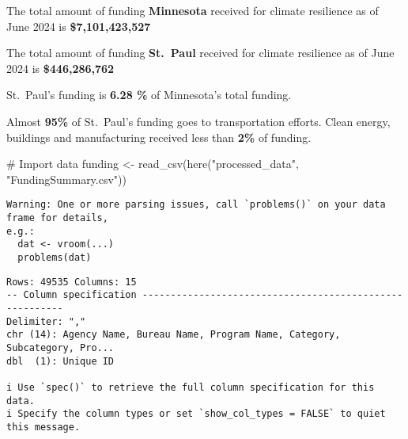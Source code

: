\documentclass[
  letterpaper,
  DIV=11,
  numbers=noendperiod]{scrartcl}
\newenvironment{Shaded}{\begin{snugshade}}{\end{snugshade}}
\newcommand{\CommentTok}[1]{\textcolor[rgb]{0.37,0.37,0.37}{#1}}
\newcommand{\FunctionTok}[1]{\textcolor[rgb]{0.28,0.35,0.67}{#1}}
\newcommand{\NormalTok}[1]{\textcolor[rgb]{0.00,0.23,0.31}{#1}}
\newcommand{\OtherTok}[1]{\textcolor[rgb]{0.00,0.23,0.31}{#1}}
\newcommand{\StringTok}[1]{\textcolor[rgb]{0.13,0.47,0.30}{#1}}
\begin{document}
\begin{tcolorbox}[enhanced jigsaw, rightrule=.15mm, bottomtitle=1mm, arc=.35mm, toptitle=1mm, leftrule=.75mm, toprule=.15mm, titlerule=0mm, title=\textcolor{quarto-callout-note-color}{\faInfo}\hspace{0.5em}{RQ 1: How much climate resilience funding has St.~Paul received?}, opacitybacktitle=0.6, opacityback=0, colback=white, breakable, coltitle=black, bottomrule=.15mm, colframe=quarto-callout-note-color-frame, left=2mm, colbacktitle=quarto-callout-note-color!10!white]

The total amount of funding \textbf{Minnesota} received for climate
resilience as of June 2024 is \textbf{\$7,101,423,527}

The total amount of funding \textbf{St.~Paul} received for climate
resilience as of June 2024 is \textbf{\$446,286,762}

St.~Paul's funding is \textbf{6.28 \%} of Minnesota's total funding.

Almost \textbf{95\%} of St.~Paul's funding goes to transportation
efforts. Clean energy, buildings and manufacturing received less than
\textbf{2\%} of funding.

\end{tcolorbox}

\begin{Shaded}
\begin{Highlighting}[]
\CommentTok{\# Import data}
\NormalTok{funding }\OtherTok{\textless{}{-}} \FunctionTok{read\_csv}\NormalTok{(}\FunctionTok{here}\NormalTok{(}\StringTok{"processed\_data"}\NormalTok{, }\StringTok{"FundingSummary.csv"}\NormalTok{))}
\end{Highlighting}
\end{Shaded}

\begin{verbatim}
Warning: One or more parsing issues, call `problems()` on your data frame for details,
e.g.:
  dat <- vroom(...)
  problems(dat)
\end{verbatim}

\begin{verbatim}
Rows: 49535 Columns: 15
-- Column specification --------------------------------------------------------
Delimiter: ","
chr (14): Agency Name, Bureau Name, Program Name, Category, Subcategory, Pro...
dbl  (1): Unique ID

i Use `spec()` to retrieve the full column specification for this data.
i Specify the column types or set `show_col_types = FALSE` to quiet this message.
\end{verbatim}
\end{document}
